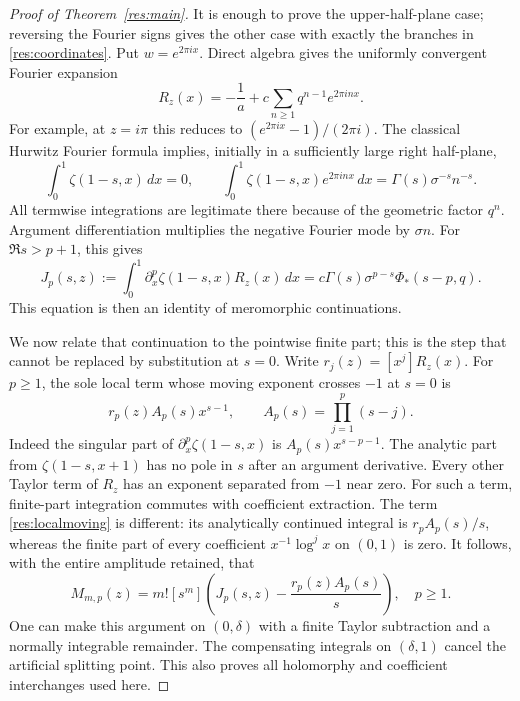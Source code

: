 \begin{proof}[Proof of Theorem~\ref{res:main}]
It is enough to prove the upper-half-plane case; reversing the
Fourier signs gives the other case with exactly the branches in
\eqref{res:coordinates}. Put $w=e^{2\pi ix}$. Direct algebra gives
the uniformly convergent Fourier expansion
\begin{equation}\label{res:fourierkernel}
 R_z(x)=-\frac1a+c\sum_{n\ge1}q^{n-1}e^{2\pi inx}.
\end{equation}
For example, at $z=i\pi$ this reduces to
$(e^{2\pi ix}-1)/(2\pi i)$. The classical Hurwitz Fourier formula
\cite[\S25.11]{DLMF} implies, initially in a sufficiently large
right half-plane,
\[
 \int_0^1\zeta(1-s,x)\,dx=0,\qquad
 \int_0^1\zeta(1-s,x)e^{2\pi inx}\,dx
       =\Gamma(s)\sigma^{-s}n^{-s}.
\]
All termwise integrations are legitimate there because of the
geometric factor $q^n$. Argument differentiation multiplies the
negative Fourier mode by $\sigma n$. For $\Re s>p+1$, this gives
\begin{equation}\label{res:spectralintegral}
 J_p(s,z):=\int_0^1\partial_x^p\zeta(1-s,x)R_z(x)\,dx
       =c\Gamma(s)\sigma^{p-s}\Phi_*(s-p,q).
\end{equation}
This equation is then an identity of meromorphic continuations.

We now relate that continuation to the pointwise finite part;
this is the step that cannot be replaced by substitution at $s=0$.
Write $r_j(z)=[x^j]R_z(x)$. For $p\ge1$, the sole local term
whose moving exponent crosses $-1$ at $s=0$ is
\begin{equation}\label{res:localmoving}
 r_p(z)A_p(s)x^{s-1},\qquad
 A_p(s)=\prod_{j=1}^p(s-j).
\end{equation}
Indeed the singular part of
$\partial_x^p\zeta(1-s,x)$ is
$A_p(s)x^{s-p-1}$. The analytic part from $\zeta(1-s,x+1)$
has no pole in $s$ after an argument derivative. Every other
Taylor term of $R_z$ has an exponent separated from $-1$ near
zero. For such a term, finite-part integration commutes with
coefficient extraction. The term \eqref{res:localmoving} is different:
its analytically continued integral is $r_pA_p(s)/s$, whereas the
finite part of every coefficient $x^{-1}\log^j x$ on $(0,1)$ is zero.
It follows, with the entire amplitude retained, that
\begin{equation}\label{res:completion}
 M_{m,p}(z)=m![s^m]
            \left(J_p(s,z)-\frac{r_p(z)A_p(s)}s\right),\quad p\ge1.
\end{equation}
One can make this argument on $(0,\delta)$ with a finite Taylor
subtraction and a normally integrable remainder. The compensating
integrals on $(\delta,1)$ cancel the artificial splitting point.
This also proves all holomorphy and coefficient interchanges used here.


\end{proof}
